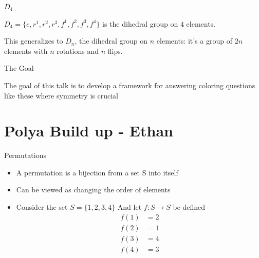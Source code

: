 \documentclass{beamer}
\begin{document}
\begin{frame}{$D_4$}
\begin{center}

	\end{center}
	$D_4=\{e,r^1,r^2,r^3,f^1,f^2,f^3,f^4\}$ is the dihedral group on $4$ elements.

	This generalizes to $D_n$, the dihedral group on $n$ elements: it's a group of $2n$ elements with $n$ rotations and $n$ flips.
\end{frame}

\begin{frame}{The Goal}

    The goal of this talk is to develop a framework for
    answering coloring questions like these where symmetry
    is crucial
\end{frame}

\section{Polya Build up - Ethan}

\begin{frame}{Permutations}
	\begin{itemize}
	\item A permutation is a bijection from a set S into itself
    \item Can be viewed as changing the order of elements
    \item Consider the set $S = \{1,2,3,4\}$ And let $f : S \to S$ be defined
    \begin{align*}
    	f(1) &= 2 \\
        f(2) &= 1 \\
        f(3) &= 4 \\
        f(4) &= 3 \\
    \end{align*}
	\end{itemize}
\end{frame}
\end{document}
